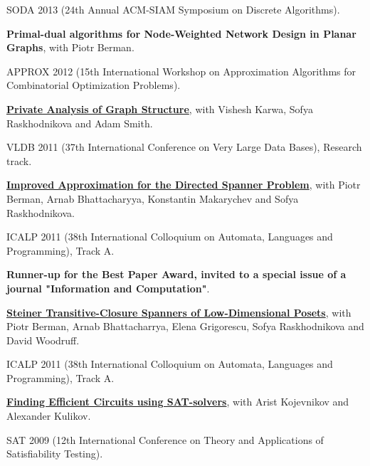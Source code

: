 \documentclass[11pt]{article}
\newenvironment{lonelist}[1][\enskip\textbullet]%
        {\vspace{-\baselineskip}\begin{list}{#1}{%
        \setlength{\partopsep}{0pt}%
        \setlength{\topsep}{0pt}}}
        {\end{list}\vspace{-.6\baselineskip}}
\begin{document}
\begin{lonelist}
SODA 2013 (24th Annual ACM-SIAM Symposium on Discrete Algorithms).

\item \textbf{Primal-dual algorithms for Node-Weighted Network Design in Planar Graphs}, with Piotr Berman.

APPROX 2012 (15th International Workshop on Approximation Algorithms for Combinatorial Optimization Problems).

\item \href{http://grigory.us/files/PrivateGraphStructure-VLDB11.pdf}{
    \textbf{Private Analysis of Graph Structure}},
with Vishesh Karwa, Sofya Raskhodnikova and Adam Smith.

VLDB 2011 (37th International Conference on Very Large Data Bases), Research track.

\item \href{http://grigory.us/files/publications/directed-spanners-journal-submitted.pdf}
{\textbf{Improved Approximation for the Directed Spanner Problem}}, with Piotr Berman, Arnab Bhattacharyya, Konstantin Makarychev and Sofya Raskhodnikova.

ICALP 2011 (38th International Colloquium on Automata, Languages and Programming), Track A. 

\textbf{Runner-up for the Best Paper Award, invited to a special issue of a journal "Information and Computation"}.

\item \href{http://grigory.us/files/steiner-ICALP11.pdf}{\textbf{Steiner Transitive-Closure Spanners of Low-Dimensional Posets}},
with Piotr Berman, Arnab Bhattacharrya, Elena Grigorescu, Sofya Raskhodnikova and David Woodruff.

ICALP 2011 (38th International Colloquium on Automata, Languages and Programming), Track A.

\item \href{http://grigory.us/files/publications/0903_SAT2009_Efficient_Boolean_Circuits.pdf}{\textbf{Finding Efficient Circuits using SAT-solvers}}, with
Arist Kojevnikov and Alexander Kulikov.

SAT 2009 (12th International Conference on Theory and Applications of Satisfiability Testing).

\end{lonelist}
\end{document}
